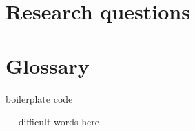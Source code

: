 \documentclass[10pt,a4paper]{article}
\begin{document}
\pagestyle{empty} 


\newpage

\setcounter{secnumdepth}{2} 
\setcounter{tocdepth}{2}

\setcounter{page}{1}
\pagestyle{plain}

\begin{multicols}{2}
\tableofcontents




\section{Research questions}









\setcounter{section}{0}
\renewcommand\thesection{\Alph{section}}
\section{Glossary}
boilerplate code

--- difficult words here ---

\end{multicols}

\printbibliography
\end{document}
